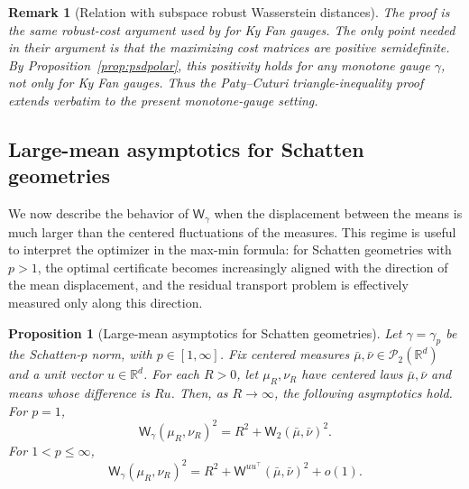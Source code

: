 \documentclass{article}
\newtheorem{proposition}[theorem]{Proposition}
\newtheorem{remark}[theorem]{Remark}
\newcommand{\R}{\mathbb{R}}
\newcommand{\cP}{\mathcal{P}}
\newcommand{\Wtwo}{\mathsf{W}_2}
\newcommand{\Wg}{\mathsf{W}_{\gamma}}
\newcommand{\WQ}[1]{\mathsf{W}^{#1}}
\begin{document}
\begin{remark}[Relation with subspace robust Wasserstein distances]
\label{rem:paty-cuturi-metric-proof}
The proof is the same robust-cost argument used by
\citet{PatyCuturi2019} for Ky Fan gauges. The only point needed in their
argument is that the maximizing cost matrices are positive semidefinite. By
Proposition~\ref{prop:psdpolar}, this positivity holds for any monotone gauge
$\gamma$, not only for Ky Fan gauges. Thus the Paty--Cuturi triangle-inequality
proof extends verbatim to the present monotone-gauge setting.
\end{remark}


\subsection{Large-mean asymptotics for Schatten geometries}
\label{subsec:large-mean-schatten}

We now describe the behavior of $\Wg$ when the displacement between the means
is much larger than the centered fluctuations of the measures. This regime is
useful to interpret the optimizer in the max-min formula: for Schatten
geometries with $p>1$, the optimal certificate becomes increasingly aligned
with the direction of the mean displacement, and the residual transport
problem is effectively measured only along this direction.

\begin{proposition}[Large-mean asymptotics for Schatten geometries]
\label{prop:large-mean-schatten}
Let $\gamma=\gamma_p$ be the Schatten-$p$ norm, with $p\in[1,\infty]$. Fix
centered measures $\bar\mu,\bar\nu\in\cP_2(\R^d)$ and a unit vector
$u\in\R^d$. For each $R>0$, let $\mu_R,\nu_R$ have centered laws
$\bar\mu,\bar\nu$ and means whose difference is $Ru$. Then, as
$R\to\infty$, the following asymptotics hold.
%
For $p=1$, 
\[
    \Wg(\mu_R,\nu_R)^2
    =
    R^2+\Wtwo(\bar\mu,\bar\nu)^2 .
\]
For $1<p\le\infty$,
\[
    \Wg(\mu_R,\nu_R)^2
    =
    R^2+\WQ{uu^\top}(\bar\mu,\bar\nu)^2+o(1).
\]
\end{proposition}
\end{document}
